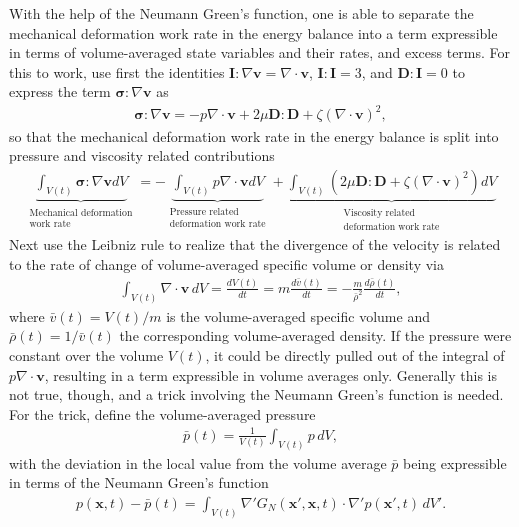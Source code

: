 With the help of the Neumann Green's function, one is able to separate the mechanical deformation work rate in the energy balance into a term expressible in terms of volume-averaged state variables and their rates, and excess terms. For this to work, use first the identities $\bm{I}:\nabla\bm{v}=\nabla\cdot\bm{v}$, $\bm{I}:\bm{I}=3$, and $\bm{D}:\bm{I}=0$ to express the term $\bm{\sigma}:\nabla\bm{v}$ as
\begin{align}
    \bm{\sigma}:\nabla\bm{v}
    =
    -p\nabla\cdot\bm{v}
    +2\mu\bm{D}:\bm{D}
    +\zeta(\nabla\cdot\bm{v})^2,
    \label{eq:stress-work-decomposition}
\end{align}
so that the mechanical deformation work rate in the energy balance is split into pressure and viscosity related contributions
\begin{align}
    \underbrace{\int_{V(t)}\bm{\sigma}:\nabla\bm{v}dV}_{\substack{\text{Mechanical deformation}\\\text{work rate}}}=-\underbrace{\int_{V(t)}p\nabla\cdot\bm{v}dV}_{\substack{\text{Pressure related}\\\text{deformation work rate}}}+\underbrace{\int_{V(t)}\left(2\mu\bm{D}:\bm{D}
    +\zeta(\nabla\cdot\bm{v})^2\right)dV}_{\substack{\text{Viscosity related}\\\text{deformation work rate}}}
\end{align}
Next use the Leibniz rule to realize that the divergence of the velocity is related to the rate of change of volume-averaged specific volume or density via
\begin{align}
    \int_{V(t)}\nabla\cdot\bm{v}\,dV
    =
    \frac{dV(t)}{dt}
    =
    m\frac{d\bar v(t)}{dt}
    =
    -\frac{m}{\bar{\rho}^2}
    \frac{d\bar{\rho}(t)}{dt},
\end{align}
where $\bar v(t)=V(t)/m$ is the volume-averaged specific volume and $\bar{\rho}(t)=1/\bar{v}(t)$ the corresponding volume-averaged density. If the pressure were constant over the volume $V(t)$, it could be directly pulled out of the integral of $p\nabla\cdot\bm{v}$, resulting in a term expressible in volume averages only. Generally this is not true, though, and a trick involving the Neumann Green's function is needed. For the trick, define the volume-averaged pressure
\begin{align}
    \bar{p}(t)=\frac{1}{V(t)}\int_{V(t)}p\,dV,
\end{align}
with the deviation in the local value from the volume average $\bar{p}$ being expressible in terms of the Neumann Green's function
\begin{align}
    p(\bm{x},t)-\bar{p}(t)=\int_{V(t)}\nabla'G_N(\bm{x}',\bm{x},t)\cdot\nabla'p(\bm{x}',t)\,dV'.
\end{align}
